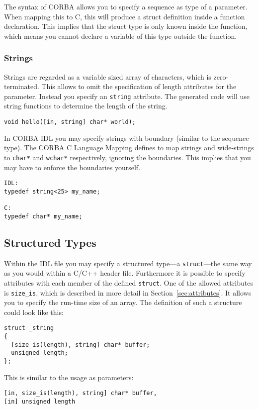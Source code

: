 The syntax of CORBA allows you to specify a sequence as type of a parameter.
When mapping this to C, this will produce a struct definition inside a
function declaration. This implies that the struct type is only known inside
the function, which means you cannot declare a variable of this type outside
the function.

\subsubsection{Strings}

Strings are regarded as a variable sized array of characters, which is
zero-terminated.  This allows to omit the specification of length attributes
for the parameter. Instead you specify an \verb|string| attribute. The
generated code will use string functions to determine the length of the
string.

\begin{verbatim}
void hello([in, string] char* world);
\end{verbatim}

In CORBA IDL you may specify strings with boundary (similar to the sequence
type). The CORBA C Language Mapping defines to map strings and wide-strings to
\verb|char*| and \verb|wchar*| respectively, ignoring the boundaries. This
implies that you may have to enforce the boundaries yourself.

\begin{verbatim}
IDL:
typedef string<25> my_name;

C:
typedef char* my_name;
\end{verbatim}

\subsection{Structured Types}

Within the IDL file you may specify a structured type---a \verb|struct|---the
same way as you would within a C/C++ header file. Furthermore it is possible
to specify attributes with each member of the defined \verb|struct|.  One of
the allowed attributes is \verb|size_is|, which is described in more detail in
Section~\ref{sec:attributes}. It allows you to specify the run-time size of an
array. The definition of such a structure could look like this:

\begin{verbatim}
struct _string
{
  [size_is(length), string] char* buffer;
  unsigned length;
};
\end{verbatim}
This is similar to the usage as parameters:
\begin{verbatim}
[in, size_is(length), string] char* buffer,
[in] unsigned length
\end{verbatim}

